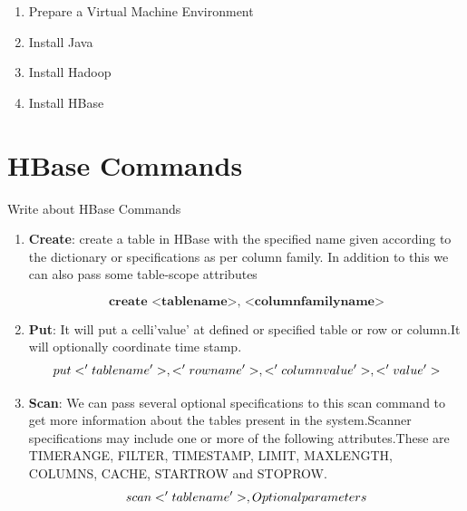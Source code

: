 \documentclass[a4paper,10pt]{article}
\begin{document}
\begin{enumerate}
	\item Prepare a Virtual Machine Environment
	\item Install Java
	\item Install Hadoop
	\item Install HBase
\end{enumerate}	

\section{HBase Commands}
Write about HBase Commands
\begin{enumerate}
		\item \textbf{Create}:
			create a table in HBase with the specified name given according to the dictionary or specifications as per column family. In addition to this we can also pass some table-scope attributes 
			
			\begin{equation}
				 \textbf{create <tablename>, <columnfamilyname>}
			\end{equation}
		\item \textbf{Put}:			  
   		 It will put a celli'value' at defined or specified table or row or column.It will optionally coordinate time stamp.
			\begin{equation}
				\boldmath put <'tablename'>,<'rowname'>,<'columnvalue'>,<'value'>
			\end{equation}
		\item \textbf{Scan}:
		    We can pass several optional specifications to this scan command to get more information about the tables present in the system.Scanner specifications may include one or more of the following attributes.These are TIMERANGE, FILTER, TIMESTAMP, LIMIT, MAXLENGTH, COLUMNS, CACHE, STARTROW and STOPROW.
			\begin{equation}
				\boldmath scan <'tablename'>, {Optional parameters}
			\end{equation}


\end{enumerate}
\end{document}
